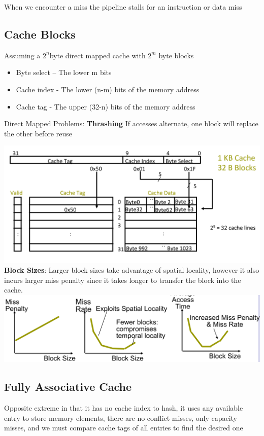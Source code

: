 When we encounter a miss the pipeline stalls for an instruction or data miss \\

\subsection*{Cache Blocks}
Assuming a $2^n$byte direct mapped cache with $2^m$ byte blocks
\begin{itemize}
\item Byte select – The lower m bits
\item Cache index - The lower (n-m) bits of the memory address
\item Cache tag - The upper (32-n) bits of the memory address
\end{itemize}
Direct Mapped Problems: \textbf{Thrashing} If accesses alternate, one block will
replace the other before reuse

\includegraphics[width=\linewidth]{png/cacheblock.png}
\textbf{Block Sizes}: Larger block sizes take advantage of spatial locality,
however it also incurs larger miss penalty since it takes longer to transfer
the block into the cache.
\includegraphics[width=\linewidth]{png/block.png}

\subsection*{Fully Associative Cache}
Opposite extreme in that it has no cache index to hash, it uses any available
entry to store memory elements, there are no conflict misses, only capacity
misses, and we must compare cache tags of all entries to find the desired one


